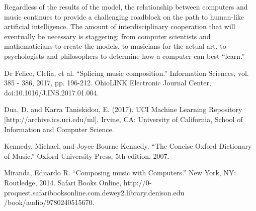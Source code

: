 \documentclass[12pt]{article}
\begin{document}
Regardless of the results of the model, the relationship between computers and music continues to provide a challenging roadblock on the path to human-like artificial intelligence. The amount of interdisciplinary cooperation that will eventually be necessary is staggering; from computer scientists and mathematicians to create the models, to musicians for the actual art, to psychologists and philosophers to determine how a computer can best ``learn.'' 
\newpage
\begin{thebibliography}{10}
  De Felice, Clelia, et al. ``Splicing music composition.'' Information Sciences, vol. 385 - 386, 2017, pp. 196-212. OhioLINK Electronic Journal Center, doi:10.1016/J.INS.2017.01.004.

  Dua, D. and Karra Taniskidou, E. (2017). UCI Machine Learning Repository [http://archive.ics.uci.edu/ml]. Irvine, CA: University of California, School of Information and Computer Science.

  Kennedy, Michael, and Joyce Bourne Kennedy. ``The Concise Oxford Dictionary of Music.'' Oxford University Press, 5th edition, 2007. 
  
  Miranda, Eduardo R. ``Composing music with Computers.'' New York, NY: Routledge, 2014. Safari Books Online, http://0-proquest.safaribooksonline.com.dewey2.library.denison.edu\\/book/audio/9780240515670.
\end{thebibliography}
\end{document}
